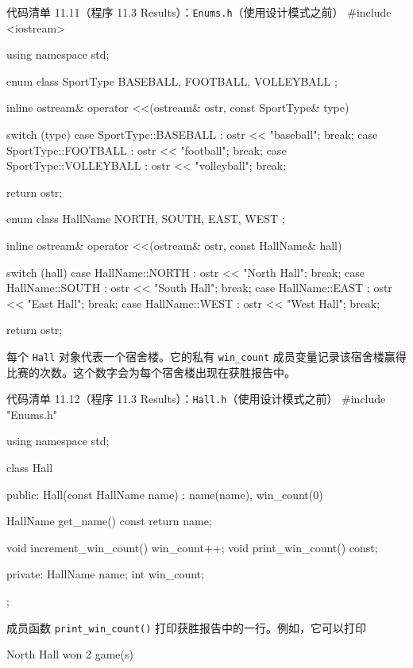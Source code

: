 \begin{codeboxt}{代码清单 11.11（程序 11.3 Results）：\texttt{Enums.h}（使用设计模式之前）}
#include <iostream>

using namespace std;

enum class SportType { BASEBALL, FOOTBALL, VOLLEYBALL };

inline ostream& operator <<(ostream& ostr, const SportType& type)
{
    switch (type)
    {
        case SportType::BASEBALL   : ostr << "baseball";   break;
        case SportType::FOOTBALL   : ostr << "football";   break;
        case SportType::VOLLEYBALL : ostr << "volleyball"; break;
    }

    return ostr;
}

enum class HallName { NORTH, SOUTH, EAST, WEST };

inline ostream& operator <<(ostream& ostr, const HallName& hall)
{
    switch (hall)
    {
        case HallName::NORTH : ostr << "North Hall"; break;
        case HallName::SOUTH : ostr << "South Hall"; break;
        case HallName::EAST  : ostr << "East Hall";  break;
        case HallName::WEST  : ostr << "West Hall";  break;
    }

    return ostr;
}
\end{codeboxt}

每个 \texttt{Hall} 对象代表一个宿舍楼。它的私有 \texttt{win\_\allowbreak{}count} 成员变量记录该宿舍楼赢得比赛的次数。这个数字会为每个宿舍楼出现在获胜报告中。

\begin{codeboxt}{代码清单 11.12（程序 11.3 Results）：\texttt{Hall.h}（使用设计模式之前）}
#include "Enums.h"

using namespace std;

class Hall
{
public:
    Hall(const HallName name) : name(name), win_count(0) {}

    HallName get_name() const { return name; }

    void increment_win_count() { win_count++; }
    void print_win_count() const;

private:
    HallName name;
    int win_count;
};
\end{codeboxt}

成员函数 \texttt{print\_\allowbreak{}win\_\allowbreak{}count(\allowbreak{})\allowbreak{}} 打印获胜报告中的一行。例如，它可以打印

\begin{codebox}
North Hall won 2 game(s)
\end{codebox}

